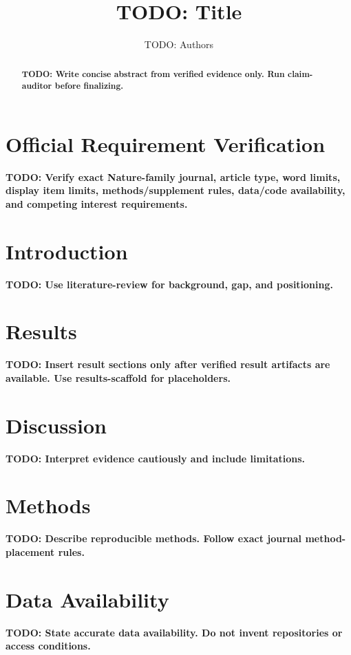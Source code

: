 \documentclass[11pt]{article}
\title{TODO: Title}
\author{TODO: Authors}
\date{}
\newcommand{\todo}[1]{\textbf{TODO: #1}}
\begin{document}
\maketitle

\section*{Official Requirement Verification}

\todo{Verify exact Nature-family journal, article type, word limits, display item limits, methods/supplement rules, data/code availability, and competing interest requirements.}

\begin{abstract}
\todo{Write concise abstract from verified evidence only. Run claim-auditor before finalizing.}
\end{abstract}

\section{Introduction}

\todo{Use literature-review for background, gap, and positioning.}

\section{Results}

\todo{Insert result sections only after verified result artifacts are available. Use results-scaffold for placeholders.}

\section{Discussion}

\todo{Interpret evidence cautiously and include limitations.}

\section{Methods}

\todo{Describe reproducible methods. Follow exact journal method-placement rules.}

\section*{Data Availability}

\todo{State accurate data availability. Do not invent repositories or access conditions.}
\end{document}
